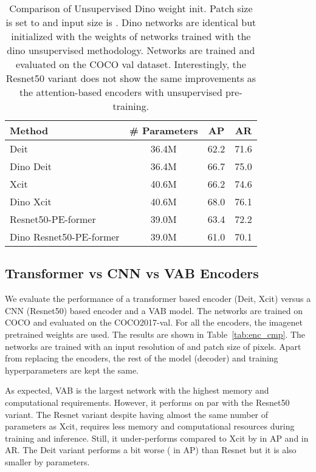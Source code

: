 \documentclass[runningheads]{llncs}
\begin{document}
\begin{table}[t]
  \centering
  \begin{tabular}{|l||c|c|c|}
   \hline 
   {\bf Method} &  {\bf \# Parameters} & {\bf AP} & {\bf AR} \\
   \hline\hline
   Deit               & 36.4M & 62.2 & 71.6 \\ 
   \hline
   Dino Deit          & 36.4M & 66.7 & 75.0 \\ 
   \hline
   Xcit               & 40.6M & 66.2 & 74.6 \\ 
   \hline
   Dino Xcit          & 40.6M & 68.0 & 76.1 \\ 
   \hline\hline
   Resnet50-PE-former      & 39.0M & 63.4 & 72.2 \\ 
   \hline
   Dino Resnet50-PE-former & 39.0M & 61.0 & 70.1 \\ 
   \hline
  \end{tabular}
  \caption{Comparison of Unsupervised Dino weight init. 
  Patch size is set to  and input size is . Dino networks are 
  identical but initialized with the weights of networks trained  with the dino unsupervised methodology.   Networks are trained and evaluated on the COCO val dataset. Interestingly, the Resnet50 variant does not show the same improvements as the attention-based encoders with unsupervised pre-training.}

  \label{tab:unsupervised}
\end{table}

\subsection{Transformer vs CNN vs VAB Encoders}
\label{sec:enc_cmp}
We evaluate the performance of a transformer based encoder (Deit, Xcit) versus a 
CNN (Resnet50) based encoder and a VAB model. The networks are trained on COCO 
and evaluated on the COCO2017-val. 
For all the encoders, the imagenet pretrained weights are used. The results are shown in Table~\ref{tab:enc_cmp}. The networks are trained with an input resolution of  and patch size of  pixels.
Apart from replacing the encoders, the rest of the model (decoder) and training hyperparameters are kept the same.

As expected, VAB is the largest network with the highest memory and computational requirements. 
However, it performs on par with the Resnet50 variant. The Resnet variant despite having almost the same number of parameters as Xcit, requires less memory and computational resources during training and inference. Still, it under-performs compared to Xcit by  in AP and  in AR.
The Deit variant performs a bit worse ( in AP) than Resnet but it is also smaller by  parameters. 
\end{document}
